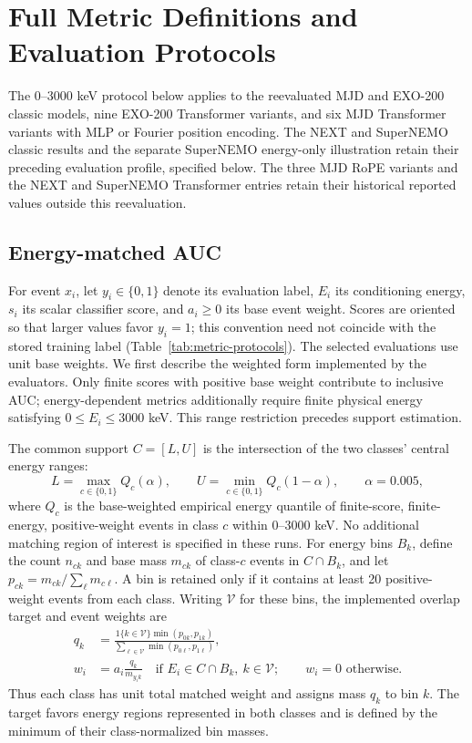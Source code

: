 \section{Full Metric Definitions and Evaluation Protocols}
\label{app:metric-details}

The 0--3000 keV protocol below applies to the reevaluated MJD and EXO-200
classic models, nine EXO-200 Transformer variants, and six MJD Transformer
variants with MLP or Fourier position encoding. The NEXT and SuperNEMO
classic results and the separate SuperNEMO energy-only illustration retain
their preceding evaluation profile, specified below. The three MJD RoPE
variants and the NEXT and SuperNEMO Transformer entries retain their
historical reported values outside this reevaluation.

\subsection{Energy-matched AUC}
\label{sec:matched-auc}
For event $x_i$, let $y_i\in\{0,1\}$ denote its evaluation label, $E_i$ its
conditioning energy, $s_i$ its scalar classifier score, and $a_i\geq0$ its
base event weight. Scores are oriented so that larger values favor $y_i=1$;
this convention need not coincide with the stored training label
(Table~\ref{tab:metric-protocols}). The selected evaluations use unit base
weights. We first describe the weighted form implemented by the evaluators.
Only finite scores with positive base weight contribute to inclusive AUC;
energy-dependent metrics additionally require finite physical energy satisfying
$0\leq E_i\leq3000$ keV. This range restriction precedes support estimation.

The common support $C=[L,U]$ is the intersection of the two classes'
central energy ranges:
\begin{equation}
 L=\max_{c\in\{0,1\}} Q_c(\alpha),\qquad
 U=\min_{c\in\{0,1\}} Q_c(1-\alpha),\qquad \alpha=0.005,
 \label{eq:common-support}
\end{equation}
where $Q_c$ is the base-weighted empirical energy quantile of finite-score,
finite-energy, positive-weight events in class $c$ within 0--3000 keV.
No additional matching region of interest is specified in these runs.
For energy bins $B_k$, define the count $n_{ck}$ and base mass $m_{ck}$ of
class-$c$ events in $C\cap B_k$, and let
$p_{ck}=m_{ck}/\sum_\ell m_{c\ell}$. A bin is retained only if it contains
at least 20 positive-weight events from each class. Writing $\mathcal V$ for
these bins, the implemented overlap target and event weights are
\begin{align}
 q_k&=\frac{\mathrm{1}\{k\in\mathcal V\}\min(p_{0k},p_{1k})}
 {\sum_{\ell\in\mathcal V}\min(p_{0\ell},p_{1\ell})},
 \label{eq:overlap-target}\\
 w_i&=a_i\frac{q_k}{m_{y_i k}}
 \quad\text{if }E_i\in C\cap B_k,\ k\in\mathcal V;
 \qquad w_i=0\text{ otherwise}.
 \label{eq:matching-weights}
\end{align}
Thus each class has unit total matched weight and assigns mass $q_k$ to
bin $k$. The target favors energy regions represented in both classes and is
defined by the minimum of their class-normalized bin masses.

